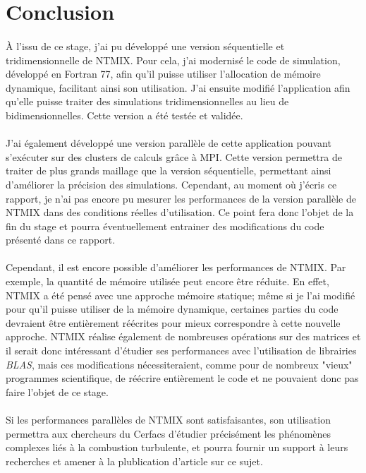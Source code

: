 \section*{Conclusion}

\paragraph{}À l'issu de ce stage, j'ai pu développé une version séquentielle et tridimensionnelle de NTMIX. Pour cela, j'ai modernisé le code de simulation, développé en Fortran 77, afin qu'il puisse utiliser l'allocation de mémoire dynamique, facilitant ainsi son utilisation. J'ai ensuite modifié l'application afin qu'elle puisse traiter des simulations tridimensionnelles au lieu de bidimensionnelles. Cette version a été testée et validée.


\paragraph{}J'ai également développé une version parallèle de cette application pouvant s'exécuter sur des clusters de calculs grâce à MPI. Cette version permettra de traiter de plus grands maillage que la version séquentielle, permettant ainsi d'améliorer la précision des simulations. Cependant, au moment où j'écris ce rapport, je n'ai pas encore pu mesurer les performances de la version parallèle de NTMIX dans des conditions réelles d'utilisation. Ce point fera donc l'objet de la fin du stage et pourra éventuellement entrainer des modifications du code présenté dans ce rapport.




\paragraph{}Cependant, il est encore possible d'améliorer les performances de NTMIX. Par exemple, la quantité de mémoire utilisée peut encore être réduite. En effet, NTMIX a été pensé avec une approche mémoire statique; même si je l'ai modifié pour qu'il puisse utiliser de la mémoire dynamique, certaines parties du code devraient être entièrement réécrites pour mieux correspondre à cette nouvelle approche. 
NTMIX réalise également de nombreuses opérations sur des matrices et il serait donc intéressant d'étudier ses performances avec l'utilisation de librairies \textit{BLAS}, mais ces modifications nécessiteraient, comme pour de nombreux "vieux" programmes scientifique, de réécrire entièrement le code et ne pouvaient donc pas faire l'objet de ce stage.


\paragraph{}Si les performances parallèles de NTMIX sont satisfaisantes, son utilisation permettra aux chercheurs du Cerfacs d'étudier précisément les phénomènes complexes liés à la combustion turbulente, et pourra fournir un support à leurs recherches et amener à la plublication d'article sur ce sujet.
